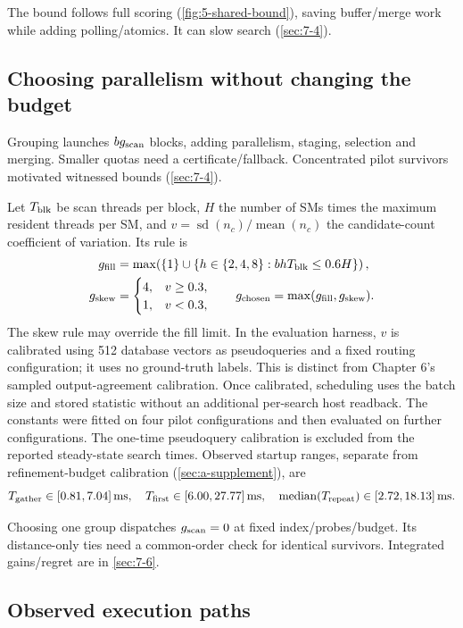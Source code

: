The bound follows full scoring (\cref{fig:5-shared-bound}), saving buffer/merge work while adding polling/atomics. It can slow search (\cref{sec:7-4}).

\subsection{Choosing parallelism without changing the budget}

Grouping launches $bg_{\mathrm{scan}}$ blocks, adding parallelism, staging, selection and merging. Smaller quotas need a certificate/fallback. Concentrated pilot survivors motivated witnessed bounds (\cref{sec:7-4}).

Let $T_{\rm blk}$ be scan threads per block, $H$ the number of SMs times
the maximum resident threads per SM, and
$v=\operatorname{sd}(n_c)/\operatorname{mean}(n_c)$ the candidate-count
coefficient of variation. Its rule is
\begin{align}
 g_{\rm fill}
 &=\max\!\left(\{1\}\cup
       \{h\in\{2,4,8\}:bhT_{\rm blk}\leq0.6H\}\right),
       \label{eq:5-fill-rule}\\
 g_{\rm skew}&=
   \begin{cases}4,&v\geq0.3,\\1,&v<0.3,\end{cases}
 \qquad
 g_{\rm chosen}=\max(g_{\rm fill},g_{\rm skew}).
 \label{eq:5-skew-rule}
\end{align}
The skew rule may override the fill limit. In the evaluation harness,
$v$ is calibrated using 512 database vectors as pseudoqueries and a
fixed routing configuration; it uses no ground-truth labels. This is
distinct from Chapter 6's sampled output-agreement calibration. Once
calibrated, scheduling uses the batch size and stored statistic without
an additional per-search host readback. The constants were fitted on
four pilot configurations and then evaluated on further configurations.
The one-time pseudoquery calibration is excluded from
the reported steady-state search times. Observed startup ranges, separate from refinement-budget calibration (\cref{sec:a-supplement}), are
\[
 T_{\rm gather}\in[0.81,7.04]\,\mathrm{ms},\quad
 T_{\rm first}\in[6.00,27.77]\,\mathrm{ms},\quad
 \operatorname{median}(T_{\rm repeat})\in[2.72,18.13]\,\mathrm{ms}.
\]

Choosing one group dispatches $g_{\mathrm{scan}}=0$ at fixed index/probes/budget. Its distance-only ties need a common-order check for identical survivors. Integrated gains/regret are in \cref{sec:7-6}.

\subsection{Observed execution paths}

